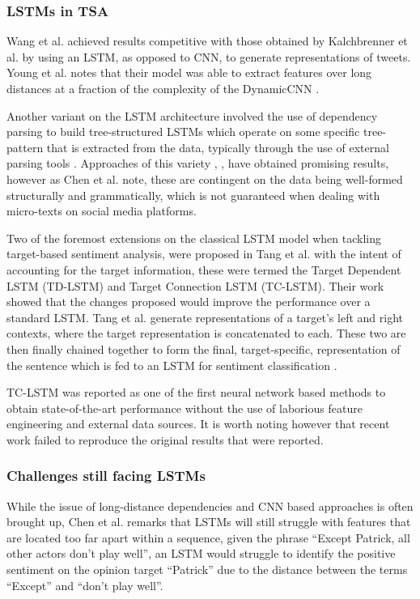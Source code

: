 \documentclass[../../fyp.tex]{subfiles}
\begin{document}
\subsubsection{LSTMs in TSA}
Wang et al. \cite{wang} achieved results competitive with those obtained by Kalchbrenner et al. \cite{kalchbrenner2014} by using an LSTM, as opposed to CNN, to generate representations of tweets. Young et al. \cite{young2017} notes that their model was able to extract features over long distances at a fraction of the complexity of the DynamicCNN \cite{kalchbrenner2014}.

Another variant on the LSTM architecture involved the use of dependency parsing to build tree-structured LSTMs which operate on some specific tree-pattern that is extracted from the data, typically through the use of external parsing tools \cite{socher2013}. Approaches of this variety \cite{jiweili2015}, \cite{kaishengtai2015}, \cite{zhu2015} have obtained promising results, however as Chen et al. \cite{chen2017} note, these are contingent on the data being well-formed structurally and grammatically, which is not guaranteed when dealing with micro-texts on social media platforms.

Two of the foremost extensions on the classical LSTM model when tackling target-based sentiment analysis, were proposed in Tang et al. \cite{tang2016b} with the intent of accounting for the target information, these were termed the Target Dependent LSTM (TD-LSTM) and Target Connection LSTM (TC-LSTM). Their work showed that the changes proposed would improve the performance over a standard LSTM. Tang et al. \cite{tang2016b} generate representations of a target's left and right contexts, where the target representation is concatenated to each. These two are then finally chained together to form the final, target-specific, representation of the sentence which is fed to an LSTM for sentiment classification \cite{dehongma2017}.

TC-LSTM \cite{tang2016b} was reported as one of the first neural network based methods to obtain state-of-the-art performance without the use of laborious feature engineering and external data sources. It is worth noting however that recent work \cite{moore2018} failed to reproduce the original results that were reported.

\subsubsection{Challenges still facing LSTMs}
While the issue of long-distance dependencies and CNN based approaches is often brought up, Chen et al. \cite{chen2017} remarks that LSTMs will still struggle with features that are located too far apart within a sequence, given the phrase \enquote{Except Patrick, all other actors don’t play well}, an LSTM would struggle to identify the positive sentiment on the opinion target \enquote{Patrick} due to the distance between the terms \enquote{Except} and \enquote{don't play well}.
\end{document}
